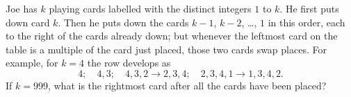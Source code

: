 Joe has $k$ playing cards labelled with the distinct integers $1$ to $k$. He first puts down card $k$. Then he puts down the cards $k-1$, $k-2$, \dots, $1$ in this order, each to the right of the cards already down; but whenever the leftmost card on the table is a multiple of the card just placed, those two cards swap places. For example, for $k=4$ the row develops as
\[4;\quad4,3;\quad4,3,2\to2,3,4;\quad2,3,4,1\to1,3,4,2.\]
If $k=999$, what is the rightmost card after all the cards have been placed?
